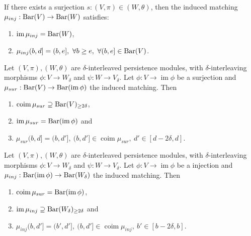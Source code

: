 \begin{lemma}
    If there exists a surjection $s: (V, \pi) \in (W, \theta) $, then the induced matching $ \mu_{inj}: \operatorname{Bar}(V) \to \operatorname{Bar} (W) $ satisfies:
    \begin{enumerate}
        \item $\operatorname{im} \mu_{inj} = \operatorname{Bar}(W)$,
        \item $\mu_{inj}(b, d] = (b, e], \ \forall b \geq e, \ \forall (b, e] \in \operatorname{Bar}(V)$.
    \end{enumerate}
\end{lemma}

\begin{lemma}
    Let $ (V, \pi), (W, \theta) $ are $\delta$-interleaved persistence modules, with $\delta$-interleaving morphisms $ \phi: V \to W_\delta $ and $ \psi: W \to V_\delta $. Let $ \phi: V \to \operatorname{im}\phi $ be a surjection and $ \mu_{sur}: \operatorname{Bar}(V) \to \operatorname{Bar} (\operatorname{im} \phi)$ the induced matching. Then
    \begin{enumerate}
        \item $\operatorname{coim} \mu_{sur} \supseteq \operatorname{Bar} (V)_{\geq 2\delta} $,
        \item $ \operatorname{im} \mu_{sur} = \operatorname{Bar} (\operatorname{im} \phi)$ and
        \item $ \mu_{sur}(b, d] = (b, d'], \ (b, d'] \in \operatorname{coim} \mu_{sur}, \ d' \in [d-2\delta, d]$.
    \end{enumerate}
\end{lemma}

\begin{lemma}
    Let $ (V, \pi), (W, \theta) $ are $\delta$-interleaved persistence modules, with $\delta$-interleaving morphisms $ \phi: V \to W_\delta $ and $ \psi: W \to V_\delta $. Let $ \phi: V \to \operatorname{im}\phi $ be a injection and $ \mu_{inj}: \operatorname{Bar}(\operatorname{im} \phi) \to \operatorname{Bar} (W_\delta)$ the induced matching. Then
    \begin{enumerate}
        \item $\operatorname{coim} \mu_{sur} = \operatorname{Bar} (\operatorname{im} \phi) $,
        \item $ \operatorname{im} \mu_{inj} \supseteq \operatorname{Bar} (W_\delta)_{\geq 2\delta} $ and
        \item $ \mu_{inj}(b, d'] = (b', d'], \ (b, d'] \in \operatorname{coim} \mu_{inj}, \ b' \in [b-2\delta, b]$.
    \end{enumerate}
\end{lemma}

